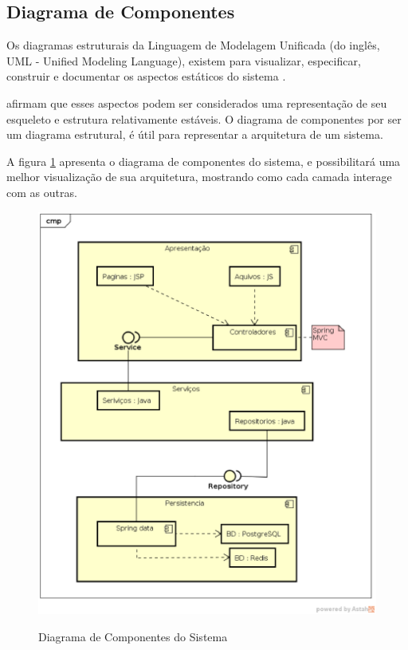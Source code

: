 \documentclass[a4paper,12pt]{monografia}
\begin{document}

\subsection{Diagrama de Componentes} %
\label{sub:diagrama_de_componentes}

Os diagramas estruturais da Linguagem de Modelagem Unificada (do inglês, UML - Unified Modeling Language), existem para visualizar, especificar, construir e documentar os aspectos estáticos do sistema \cite{booch2006uml}. 

 afirmam que esses aspectos podem ser considerados uma representação de seu esqueleto e estrutura relativamente estáveis. O diagrama de componentes por ser um diagrama estrutural, é útil para representar a arquitetura de um sistema.

A figura \ref{fig:cd} apresenta o diagrama de componentes do sistema, e possibilitará uma melhor visualização de sua arquitetura, mostrando como cada camada interage com as outras.

\begin{figure}[H]
\centering
\caption{Diagrama de Componentes do Sistema}
\centering
\includegraphics[width=15cm]{img/diagramas/cd.eps}\\
\label{fig:cd}
\end{figure}
\end{document}
